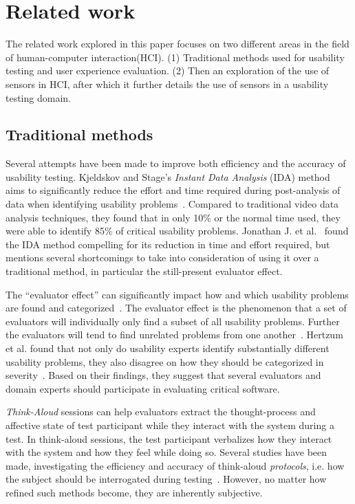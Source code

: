 \section{Related work}
The related work explored in this paper focuses on two different areas in the field of human-computer interaction(HCI). (1) Traditional methods used for usability testing and user experience evaluation. (2) Then an exploration of the use of sensors in HCI, after which it further details the use of sensors in a usability testing domain.

\subsection{Traditional methods}
Several attempts have been made to improve both efficiency and the accuracy of
usability testing. Kjeldskov and Stage's \textit{Instant Data
Analysis} (IDA) method aims to significantly reduce the effort and time required
during post-analysis of data when identifying usability
problems~\cite{instant_data_analysis}. Compared to traditional video data
analysis techniques, they found that in only 10\% or the normal time used, they were able to
identify 85\% of critical usability problems. Jonathan J. et
al.~\cite{use_of_TA_and_IDA} found the IDA
method compelling for its reduction in time and effort required, but mentions
several shortcomings to take into consideration of using it over a traditional
method, in particular the still-present evaluator effect.

The ``evaluator effect'' can significantly impact how and which usability problems are
found and categorized~\cite{eval_effect}.
The evaluator effect is the phenomenon that a set of evaluators will individually only find a subset of all usability problems.
Further the evaluators will tend to find unrelated problems from one another~\cite{eval_effect}.
Hertzum et al. found that not only do
usability experts identify substantially different usability problems, they also
disagree on how they should be categorized in
severity~\cite{eval_effect_research}. Based on their findings, they suggest that
several evaluators and domain experts should participate in evaluating critical
software.

\textit{Think-Aloud} sessions can help evaluators extract the thought-process
and affective state of test participant while they interact with the system
during a test. In think-aloud sessions, the test participant verbalizes how
they interact with the system and how they feel while doing so.  Several studies
have been made, investigating the efficiency and accuracy of think-aloud
\textit{protocols}, i.e. how the subject should be interrogated during
testing~\cite{two_think_aloud_protocols_study}. However, no matter how refined
such methods become, they are inherently subjective.

